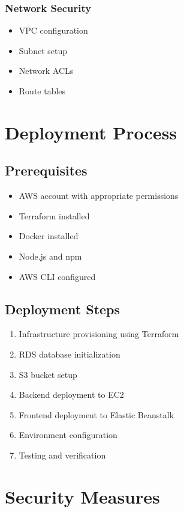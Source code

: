 \documentclass[12pt,a4paper]{article}
\begin{document}
\subsubsection{Network Security}
\begin{itemize}
    \item VPC configuration
    \item Subnet setup
    \item Network ACLs
    \item Route tables
\end{itemize}

\section{Deployment Process}

\subsection{Prerequisites}
\begin{itemize}
    \item AWS account with appropriate permissions
    \item Terraform installed
    \item Docker installed
    \item Node.js and npm
    \item AWS CLI configured
\end{itemize}

\subsection{Deployment Steps}
\begin{enumerate}
    \item Infrastructure provisioning using Terraform
    \item RDS database initialization
    \item S3 bucket setup
    \item Backend deployment to EC2
    \item Frontend deployment to Elastic Beanstalk
    \item Environment configuration
    \item Testing and verification
\end{enumerate}

\section{Security Measures}
\end{document}
